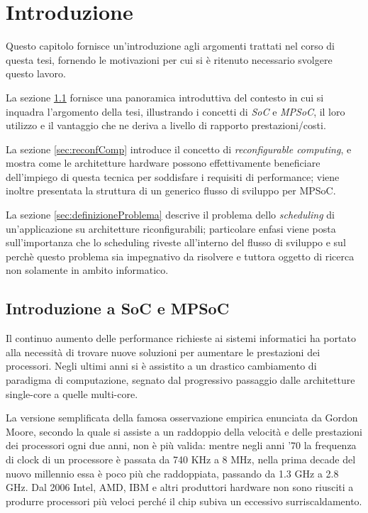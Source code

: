 \chapter{Introduzione}
\label{chap:intro}
\vspace{1cm}
Questo capitolo fornisce un'introduzione agli argomenti trattati nel corso di questa
tesi, fornendo le motivazioni per cui si \`e ritenuto necessario svolgere questo
lavoro.

La sezione \ref{sec:introSoC} fornisce una panoramica introduttiva del contesto in cui si
inquadra l'argomento della tesi, illustrando i concetti di \emph{\acl{SoC}} e
\emph{\acl{MPSoC}}, il loro utilizzo e il vantaggio che ne deriva a livello di
rapporto prestazioni/costi.

La sezione \ref{sec:reconfComp} introduce il concetto di \emph{reconfigurable computing},
e mostra come le architetture hardware possono effettivamente beneficiare dell'impiego
di questa tecnica per soddisfare i requisiti di performance; viene inoltre presentata
la struttura di un generico flusso di sviluppo per \acs{MPSoC}.

La sezione \ref{sec:definizioneProblema} descrive il problema dello \emph{scheduling} di un'applicazione
su architetture riconfigurabili; particolare enfasi viene posta sull'importanza che lo scheduling
riveste all'interno del flusso di sviluppo e sul perchè questo problema sia impegnativo da risolvere
e tuttora oggetto di ricerca non solamente in ambito informatico.

\newpage

\section{Introduzione a \acs{SoC} e \ac{MPSoC}}
\label{sec:introSoC}
Il continuo aumento delle performance richieste ai sistemi informatici ha portato alla necessit\`a
di trovare nuove soluzioni per aumentare le prestazioni dei processori. Negli ultimi anni si \`e
assistito a un drastico cambiamento di paradigma di computazione, segnato dal progressivo passaggio
dalle architetture single-core a quelle multi-core.

La versione semplificata della famosa osservazione empirica enunciata da Gordon Moore, secondo la quale
si assiste a un raddoppio della velocit\`a e delle prestazioni dei processori ogni due anni, non \`e
pi\`u valida: mentre negli anni '70 la frequenza di clock di un processore \`e passata da 740 KHz a
8 MHz, nella prima decade del nuovo millennio essa \`e poco pi\`u che raddoppiata, passando da 1.3 GHz
a 2.8 GHz. Dal 2006 Intel, AMD, IBM e altri produttori hardware non sono riusciti a produrre
processori pi\`u veloci perch\'e il chip subiva un eccessivo surriscaldamento.

